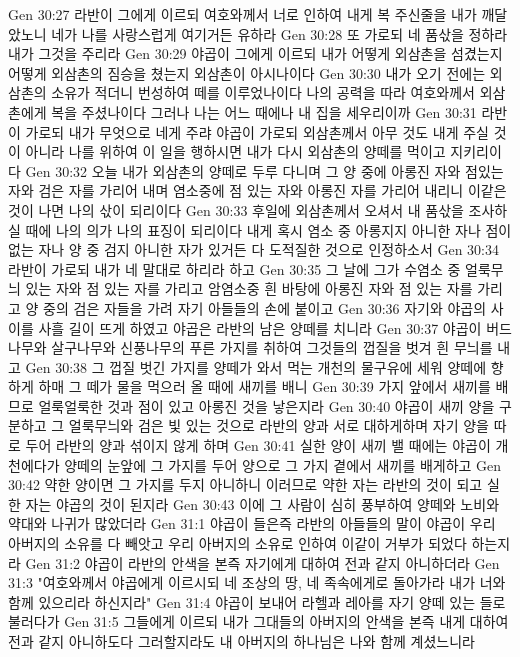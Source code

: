 Gen 30:27  라반이 그에게 이르되 여호와께서 너로 인하여 내게 복 주신줄을 내가 깨달았노니 네가 나를 사랑스럽게 여기거든 유하라
Gen 30:28  또 가로되 네 품삯을 정하라 내가 그것을 주리라
Gen 30:29  야곱이 그에게 이르되 내가 어떻게 외삼촌을 섬겼는지 어떻게 외삼촌의 짐승을 쳤는지 외삼촌이 아시나이다
Gen 30:30  내가 오기 전에는 외삼촌의 소유가 적더니 번성하여 떼를 이루었나이다 나의 공력을 따라 여호와께서 외삼촌에게 복을 주셨나이다 그러나 나는 어느 때에나 내 집을 세우리이까
Gen 30:31  라반이 가로되 내가 무엇으로 네게 주랴 야곱이 가로되 외삼촌께서 아무 것도 내게 주실 것이 아니라 나를 위하여 이 일을 행하시면 내가 다시 외삼촌의 양떼를 먹이고 지키리이다
Gen 30:32  오늘 내가 외삼촌의 양떼로 두루 다니며 그 양 중에 아롱진 자와 점있는 자와 검은 자를 가리어 내며 염소중에 점 있는 자와 아롱진 자를 가리어 내리니 이같은 것이 나면 나의 삯이 되리이다
Gen 30:33  후일에 외삼촌께서 오셔서 내 품삯을 조사하실 때에 나의 의가 나의 표징이 되리이다 내게 혹시 염소 중 아롱지지 아니한 자나 점이 없는 자나 양 중 검지 아니한 자가 있거든 다 도적질한 것으로 인정하소서
Gen 30:34  라반이 가로되 내가 네 말대로 하리라 하고
Gen 30:35  그 날에 그가 수염소 중 얼룩무늬 있는 자와 점 있는 자를 가리고 암염소중 흰 바탕에 아롱진 자와 점 있는 자를 가리고 양 중의 검은 자들을 가려 자기 아들들의 손에 붙이고
Gen 30:36  자기와 야곱의 사이를 사흘 길이 뜨게 하였고 야곱은 라반의 남은 양떼를 치니라
Gen 30:37  야곱이 버드나무와 살구나무와 신풍나무의 푸른 가지를 취하여 그것들의 껍질을 벗겨 흰 무늬를 내고
Gen 30:38  그 껍질 벗긴 가지를 양떼가 와서 먹는 개천의 물구유에 세워 양떼에 향하게 하매 그 떼가 물을 먹으러 올 때에 새끼를 배니
Gen 30:39  가지 앞에서 새끼를 배므로 얼룩얼룩한 것과 점이 있고 아롱진 것을 낳은지라
Gen 30:40  야곱이 새끼 양을 구분하고 그 얼룩무늬와 검은 빛 있는 것으로 라반의 양과 서로 대하게하며 자기 양을 따로 두어 라반의 양과 섞이지 않게 하며
Gen 30:41  실한 양이 새끼 밸 때에는 야곱이 개천에다가 양떼의 눈앞에 그 가지를 두어 양으로 그 가지 곁에서 새끼를 배게하고
Gen 30:42  약한 양이면 그 가지를 두지 아니하니 이러므로 약한 자는 라반의 것이 되고 실한 자는 야곱의 것이 된지라
Gen 30:43  이에 그 사람이 심히 풍부하여 양떼와 노비와 약대와 나귀가 많았더라
Gen 31:1  야곱이 들은즉 라반의 아들들의 말이 야곱이 우리 아버지의 소유를 다 빼앗고 우리 아버지의 소유로 인하여 이같이 거부가 되었다 하는지라
Gen 31:2  야곱이 라반의 안색을 본즉 자기에게 대하여 전과 같지 아니하더라
Gen 31:3  "여호와께서 야곱에게 이르시되 네 조상의 땅, 네 족속에게로 돌아가라 내가 너와 함께 있으리라 하신지라"
Gen 31:4  야곱이 보내어 라헬과 레아를 자기 양떼 있는 들로 불러다가
Gen 31:5  그들에게 이르되 내가 그대들의 아버지의 안색을 본즉 내게 대하여 전과 같지 아니하도다 그러할지라도 내 아버지의 하나님은 나와 함께 계셨느니라
